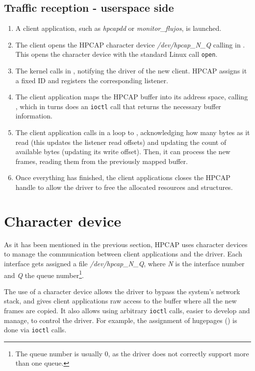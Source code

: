 \documentclass[oneside]{hpman}
\begin{document}
\subsection{Traffic reception - userspace side}

\begin{enumerate}
\item A client application, such as \textit{hpcapdd} or \textit{monitor\_flujos}, is launched.
\item The client opens the HPCAP character device \textit{/dev/hpcap\_N\_Q} calling  in . This opens the character device with the standard Linux call \texttt{open}.
\item The kernel calls  in , notifying the driver of the new client. HPCAP assigns it a fixed ID and registers the corresponding listener.
\item The client application maps the HPCAP buffer into its address space, calling , which in turns does an \texttt{ioctl} call that returns the necessary buffer information.
\item The client application calls in a loop to , acknowledging how many bytes as it read (this updates the listener read offsets) and updating the count of available bytes (updating its write offset). Then, it can process the new frames, reading them from the previously mapped buffer.
\item Once everything has finished, the client applications closes the HPCAP handle to allow the driver to free the allocated resources and structures.
\end{enumerate}

\section{Character device}
\label{sec:Chardev}

As it has been mentioned in the previous section, HPCAP uses character devices to manage the communication between client applications and the driver. Each interface gets assigned a file \textit{/dev/hpcap\_N\_Q}, where \textit{N} is the interface number and \textit{Q} the queue number\footnote{The queue number is usually 0, as the driver does not correctly support more than one queue.}.

The use of a character device allows the driver to bypass the system's network stack, and gives client applications raw access to the buffer where all the new frames are copied. It also allows using arbitrary \texttt{ioctl} calls, easier to develop and manage, to control the driver. For example, the assignment of hugepages () is done via \texttt{ioctl} calls.
\end{document}
